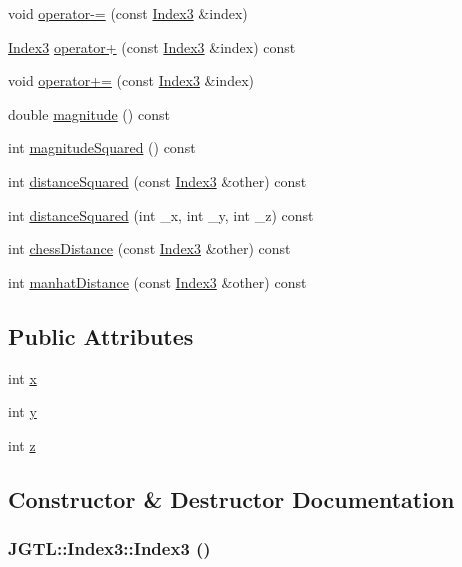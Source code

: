 \begin{CompactItemize}
void \hyperlink{class_j_g_t_l_1_1_index3_c204d4d42938bd7fc41c06041ad17661}{operator-=} (const \hyperlink{class_j_g_t_l_1_1_index3}{Index3} \&index)
\item 
\hyperlink{class_j_g_t_l_1_1_index3}{Index3} \hyperlink{class_j_g_t_l_1_1_index3_dc6ba4abf1475cdb42b5ea1fd5157414}{operator+} (const \hyperlink{class_j_g_t_l_1_1_index3}{Index3} \&index) const 
\item 
void \hyperlink{class_j_g_t_l_1_1_index3_28b8a687460de3b981aa58e2793459e6}{operator+=} (const \hyperlink{class_j_g_t_l_1_1_index3}{Index3} \&index)
\item 
double \hyperlink{class_j_g_t_l_1_1_index3_68ee3c05f26c463c7d936b94004ae097}{magnitude} () const
\item 
int \hyperlink{class_j_g_t_l_1_1_index3_c6cd24ce82dfa087a968646a9aa3fc58}{magnitude\-Squared} () const
\item 
int \hyperlink{class_j_g_t_l_1_1_index3_382f9ffa86227b2d180ea50ed3a9ddff}{distance\-Squared} (const \hyperlink{class_j_g_t_l_1_1_index3}{Index3} \&other) const 
\item 
int \hyperlink{class_j_g_t_l_1_1_index3_429d6d9c51948aec9bff8ae4e5df2b43}{distance\-Squared} (int \_\-x, int \_\-y, int \_\-z) const 
\item 
int \hyperlink{class_j_g_t_l_1_1_index3_acc8cad7f6ec9534c32c4a224c3b3670}{chess\-Distance} (const \hyperlink{class_j_g_t_l_1_1_index3}{Index3} \&other) const 
\item 
int \hyperlink{class_j_g_t_l_1_1_index3_97c6ed2e02b405f2e7c02208a54367c9}{manhat\-Distance} (const \hyperlink{class_j_g_t_l_1_1_index3}{Index3} \&other) const 
\end{CompactItemize}
\subsection*{Public Attributes}
\begin{CompactItemize}
\item 
int \hyperlink{class_j_g_t_l_1_1_index3_01306b4a1effbab2bf1358adb85ef7a1}{x}
\item 
int \hyperlink{class_j_g_t_l_1_1_index3_5723b9b685b7aaf559464973d1338e23}{y}
\item 
int \hyperlink{class_j_g_t_l_1_1_index3_bb74df1f3af23cf67605a319e27a0e55}{z}
\end{CompactItemize}


\subsection{Constructor \& Destructor Documentation}
\hypertarget{class_j_g_t_l_1_1_index3_f0f6a8a45c6d654d5a1849e2150460b3}{
\subsubsection[Index3]{\setlength{\rightskip}{0pt plus 5cm}JGTL::Index3::Index3 ()}}
\label{class_j_g_t_l_1_1_index3_f0f6a8a45c6d654d5a1849e2150460b3}


